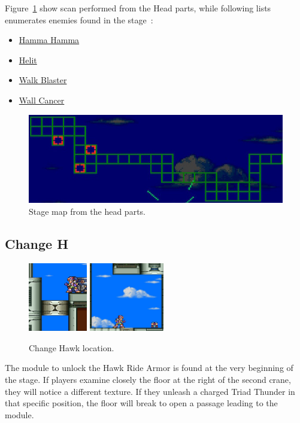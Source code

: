Figure~\ref{fig:Shipyard_map} show scan performed from the Head parts, while following lists enumerates enemies found in the stage~\cite{wiki:Shipyard}:
\begin{itemize}
	\item \hyperlink{enem:Hamma_Hamma}{Hamma Hamma}
	\item \hyperlink{enem:Helit}{Helit}
	\item \hyperlink{enem:Walk_Blaster}{Walk Blaster}
	\item \hyperlink{enem:Wall_Cancer}{Wall Cancer}
\end{itemize}

\begin{figure}[htp]
	\centering
	\includegraphics[width=.7\linewidth]{figures/X3/Crush_crawfish/map.jpg}
	\caption{Stage map from the head parts.}
	\label{fig:Shipyard_map}
\end{figure}

\subsection{Change H}
\begin{figure}[htp]
	\centering
	\includegraphics[height=3cm]{figures/X3/Crush_crawfish/hawk_1.jpg}
	\includegraphics[height=3cm]{figures/X3/Crush_crawfish/hawk_2.jpg}
	\caption{Change Hawk location.}
\end{figure}
The module to unlock the Hawk Ride Armor is found at the very beginning of the stage. If players examine closely the floor at the right of the second crane, they will notice a different texture. If they unleash a charged Triad Thunder in that specific position, the floor will break to open a passage leading to the module.


